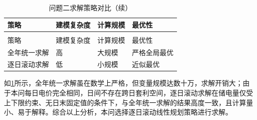\begin{longtable}{>{\centering\arraybackslash}p{}>{\centering\arraybackslash}p{}>{\centering\arraybackslash}p{}>{\centering\arraybackslash}p{}}
  \caption{问题二求解策略对比}
  \label{tab:algo2} \\
  \toprule
  策略 & 建模复杂度 & 计算规模 & 最优性 \\
  \midrule
  \endfirsthead
  \caption{问题二求解策略对比（续）} \\
  \toprule
  策略 & 建模复杂度 & 计算规模 & 最优性 \\
  \midrule
  \endhead
  \bottomrule
  \endfoot
  全年统一求解 & 高 & 大规模 & 严格全局最优 \\
  逐日滚动求解 & 低 & 小规模 & 近似最优 \\
\end{longtable}

如\ref{tab:algo2}所示，全年统一求解虽在数学上严格，但变量规模达数十万，求解开销大；由于本问每日电价完全相同，日间不存在跨日套利空间，逐日滚动求解在储电量仅受上下限约束、无日末固定值的条件下，与全年统一求解的结果高度一致，且计算量小、易于解释。综合以上分析，本问选择逐日滚动线性规划策略进行求解。
